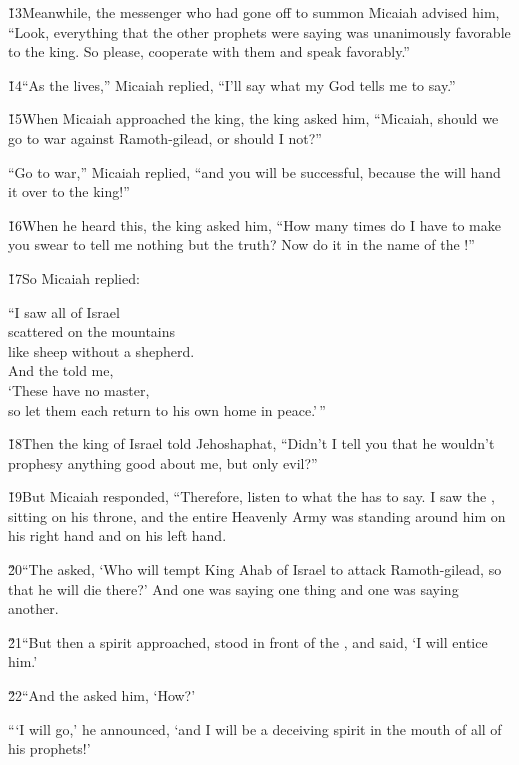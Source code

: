 \v{13}Meanwhile, the messenger who had gone off to summon Micaiah advised him, ``Look, everything that the other prophets were saying was unanimously favorable to the king. So please, cooperate with them and speak favorably.''

\v{14}``As the  lives,'' Micaiah replied, ``I'll say what my God tells me to say.''

\v{15}When Micaiah approached the king, the king asked him, ``Micaiah, should we go to war against Ramoth-gilead, or should I not?''

``Go to war,'' Micaiah replied, ``and you will be successful, because the  will hand it over to the king!''

\v{16}When he heard this, the king asked him, ``How many times do I have to make you swear to tell me nothing but the truth? Now do it in the name of the !''

\v{17}So Micaiah replied:

\begin{poetry}
\poeml ``I saw all of Israel \\
\poemll    scattered on the mountains \\
\poemlll       like sheep without a shepherd. \\
\poeml And the  told me, \\
\poemll    `These have no master, \\
\poemlll       so let them each return to his own home in peace.'\,''
\end{poetry}

\v{18}Then the king of Israel told Jehoshaphat, ``Didn't I tell you that he wouldn't prophesy anything good about me, but only evil?''

\v{19}But Micaiah responded, ``Therefore, listen to what the  has to say. I saw the , sitting on his throne, and the entire Heavenly Army was standing around him on his right hand and on his left hand.

\v{20}``The  asked, `Who will tempt King Ahab of Israel to attack Ramoth-gilead, so that he will die there?' And one was saying one thing and one was saying another.

\v{21}``But then a spirit approached, stood in front of the , and said, `I will entice him.'

\v{22}``And the  asked him, `How?'

```I will go,' he announced, `and I will be a deceiving spirit in the mouth of all of his prophets!'


